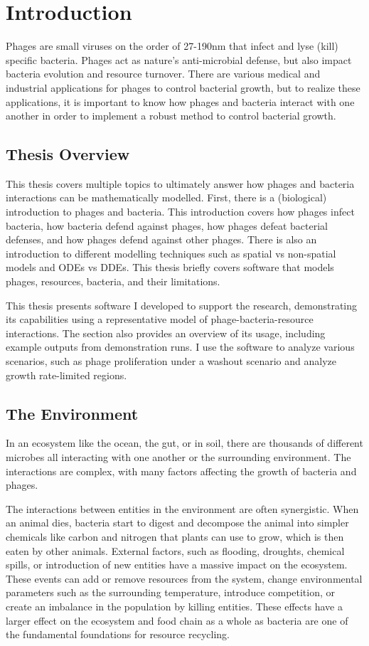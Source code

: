 \chapter{Introduction}
\label{Introduction}

Phages are small viruses on the order of 27-190nm that infect and lyse (kill) specific bacteria. 
Phages act as nature's anti-microbial defense, but also impact bacteria evolution and resource turnover. 
There are various medical and industrial applications for phages to control bacterial growth, but to realize these applications, it is important to know how phages and bacteria interact with one another in order to implement a robust method to control bacterial growth. 

\section{Thesis Overview}
This thesis covers multiple topics to ultimately answer how phages and bacteria interactions can be mathematically modelled. 
First, there is a (biological) introduction to phages and bacteria. 
This introduction covers how phages infect bacteria, how bacteria defend against phages, how phages defeat bacterial defenses, and how phages defend against other phages. 
There is also an introduction to different modelling techniques such as spatial vs non-spatial models and ODEs vs DDEs. 
This thesis briefly covers software that models phages, resources, bacteria, and their limitations. 

This thesis presents software I developed to support the research, demonstrating its capabilities using a representative model of phage-bacteria-resource interactions. 
The section also provides an overview of its usage, including example outputs from demonstration runs.
I use the software to analyze various scenarios, such as phage proliferation under a washout scenario and analyze growth rate-limited regions. 

\section{The Environment}
In an ecosystem like the ocean, the gut, or in soil, there are thousands of different microbes all interacting with one another or the surrounding environment.
The interactions are complex, with many factors affecting the growth of bacteria and phages. 

The interactions between entities in the environment are often synergistic. 
When an animal dies, bacteria start to digest and decompose the animal into simpler chemicals like carbon and nitrogen that plants can use to grow, which is then eaten by other animals. 
External factors, such as flooding, droughts, chemical spills, or introduction of new entities have a massive impact on the ecosystem. 
These events can add or remove resources from the system, change environmental parameters such as the surrounding temperature, introduce competition, or create an imbalance in the population by killing entities. 
These effects have a larger effect on the ecosystem and food chain as a whole as bacteria are one of the fundamental foundations for resource recycling. 

